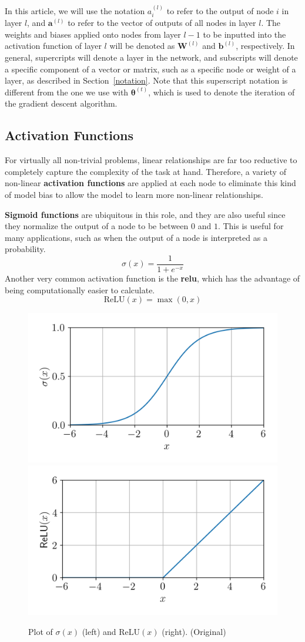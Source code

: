 \documentclass[12pt]{report}
\theoremstyle{definition}
\theoremstyle{remark}
\begin{document}
In this article, we will use the notation $a^{(l)}_i$ to refer to the output of node $i$ in layer $l$, and $\mathbf{a}^{(l)}$ to refer to the vector of outputs of all nodes in layer $l$. The weights and biases applied onto nodes from layer $l-1$ to be inputted into the activation function of layer $l$ will be denoted as $\mathbf{W}^{(l)}$ and $\mathbf{b}^{(l)}$, respectively. In general, supercripts will denote a layer in the network, and subscripts will denote a specific component of a vector or matrix, such as a specific node or weight of a layer, as described in Section~\ref{notation}. Note that this superscript notation is different from the one we use with $\boldsymbol{\theta}^{(t)}$, which is used to denote the iteration of the gradient descent algorithm.

\subsection{Activation Functions}

For virtually all non-trivial problems, linear relationships are far too reductive to completely capture the complexity of the task at hand. Therefore, a variety of non-linear \textbf{activation functions} are applied at each node to eliminate this kind of model bias to allow the model to learn more non-linear relationships.

\textbf{Sigmoid functions} are ubiquitous in this role, and they are also useful since they normalize the output of a node to be between $0$ and $1$. This is useful for many applications, such as when the output of a node is interpreted as a probability.
\begin{equation}
    \sigma(x) = \frac{1}{1+e^{-x}}
\end{equation}
Another very common activation function is the \textbf{\gls{relu}}, which has the advantage of being computationally easier to calculate.
\begin{equation}
    \text{ReLU}(x) = \max(0,x)
\end{equation}
\begin{figure}[h]
    \centering
    \includegraphics[width=0.45\linewidth]{figs/sigmoid.png}
    \includegraphics[width=0.45\linewidth]{figs/relu.png}
    \caption{Plot of $\sigma(x)$ (left) and $\text{ReLU}(x)$ (right). (Original)}
    \label{fig:enter-label}
\end{figure}
\end{document}

